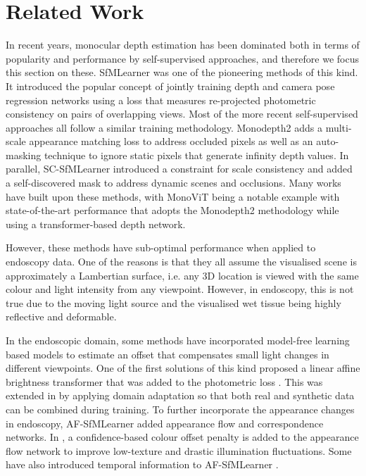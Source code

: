 \section{Related Work}
\label{sec:lit}

In recent years, monocular depth estimation has been dominated both in terms of popularity and performance by self-supervised approaches, and therefore we focus this section on these. SfMLearner \cite{zhou2017unsupervised} was one of the pioneering methods of this kind. It introduced the popular concept of jointly training depth and camera pose regression networks using a loss that measures re-projected photometric consistency on pairs of overlapping views. Most of the more recent self-supervised approaches all follow a similar training methodology. Monodepth2 \cite{godard2019digging} adds a multi-scale appearance matching loss to address occluded pixels as well as an auto-masking technique to ignore static pixels that generate infinity depth values. In parallel, SC-SfMLearner \cite{bian2019unsupervised} introduced a constraint for scale consistency and added a self-discovered mask to address dynamic scenes and occlusions. Many works have built upon these methods, with MonoViT \cite{zhao2022monovit} being a notable example with state-of-the-art performance that adopts the Monodepth2 methodology while using a transformer-based depth network. 

However, these methods have sub-optimal performance when applied to endoscopy data. One of the reasons is that they all assume the visualised scene is approximately a Lambertian surface, i.e. any 3D location is viewed with the same colour and light intensity from any viewpoint. However, in endoscopy, this is not true due to the moving light source and the visualised wet tissue being highly reflective and deformable. 

In the endoscopic domain, some methods have incorporated model-free learning based models to estimate an offset that compensates small light changes in different viewpoints. One of the first solutions of this kind proposed a linear affine brightness transformer that was added to the photometric loss \cite{ozyoruk2021endoslam}. This was extended in \cite{rau2023task} by applying domain adaptation so that both real and synthetic data can be combined during training.  To further incorporate the appearance changes in endoscopy, AF-SfMLearner \cite{shao2022self} added appearance flow and correspondence networks. In \cite{zhou2023tackling}, a conﬁdence-based colour offset penalty is added to the appearance flow network to improve low-texture and drastic illumination ﬂuctuations. Some have also introduced temporal information to AF-SfMLearner \cite{lou2024ws,shi2024long}.

